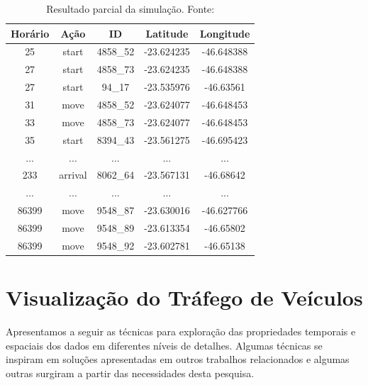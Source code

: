 \begin{table}[!htb]
\centering
\begin{tabular}{|c|c|c|c|c|}
\hline
\textbf{Horário} & \textbf{Ação} & \textbf{ID} & \textbf{Latitude} & \textbf{Longitude} \\
\hline
25 & start & 4858\_52 & -23.624235 & -46.648388 \\
27 & start & 4858\_73 & -23.624235 & -46.648388 \\
27 & start & 94\_17 & -23.535976 & -46.63561    \\
31 & move & 4858\_52 & -23.624077 & -46.648453 \\
33 & move & 4858\_73 & -23.624077 & -46.648453 \\
35 & start & 8394\_43 & -23.561275 & -46.695423 \\
... & ... & ... & ... & ... \\
233 & arrival & 8062\_64 & -23.567131 & -46.68642 \\
... & ... & ... & ... & ... \\
86399 & move & 9548\_87 & -23.630016 & -46.627766 \\
86399 & move & 9548\_89 & -23.613354 & -46.65802 \\
86399 & move & 9548\_92 & -23.602781 & -46.65138 \\
\hline
\end{tabular}
\caption{Resultado parcial da simulação. Fonte: \citet{santana2018courb} \label{table:output}}
\end{table}

\section{Visualização do Tráfego de Veículos}

  Apresentamos a seguir as técnicas para exploração das propriedades temporais
e espaciais dos dados em diferentes níveis de detalhes. Algumas técnicas se
inspiram em soluções apresentadas em outros trabalhos relacionados e algumas
outras surgiram a partir das necessidades desta pesquisa.

